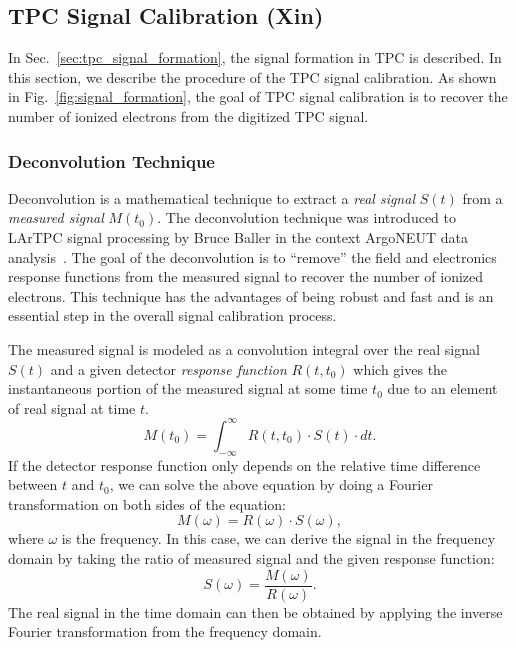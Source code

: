 \subsection{TPC Signal Calibration (Xin)}

In Sec.~\ref{sec:tpc_signal_formation}, the signal formation in TPC
is described. In this section, we describe the procedure of the TPC signal
calibration. As shown in Fig.~\ref{fig:signal_formation}, the goal of TPC 
signal calibration is to recover the number of ionized electrons from the 
digitized TPC signal. 

\subsubsection{Deconvolution Technique}\label{sec:decon}
Deconvolution is a mathematical technique to extract a \textit{real signal}
$S(t)$ from a \textit{measured signal} $M(t_0)$. 
The deconvolution technique was introduced to LArTPC signal processing by 
Bruce Baller in the context ArgoNEUT data analysis~\cite{bruce}. The goal of the 
deconvolution is to ``remove'' the field and electronics response functions 
from the measured signal to recover the number of ionized electrons. This 
technique has the advantages of being robust and fast and is an essential 
step in the overall signal calibration process. 

The measured signal is
modeled as a convolution integral over the real signal $S(t)$ and a
given detector \textit{response function} $R(t,t_0)$ which gives the
instantaneous portion of the measured signal at some time $t_0$ due to
an element of real signal at time $t$.
\begin{equation}\label{eq:decon_1}
M(t_0) = \int_{-\infty}^{\infty}  R(t,t_0) \cdot S(t) \cdot dt.
\end{equation}
If the detector response function only depends on the relative time 
difference between $t$ and $t_0$, we can solve the above equation by 
doing a Fourier transformation on both sides of the equation:
\begin{equation}
M(\omega) = R(\omega) \cdot S(\omega), 
\end{equation}
where $\omega$ is the frequency. In this case, we can derive the signal in the 
frequency domain by taking the ratio of measured signal and the given
response function:
\begin{equation}\label{eq:decon_2}
S(\omega) = \frac{M(\omega)}{R(\omega)}.
\end{equation}
The real signal in the time domain can then be obtained by applying the 
inverse Fourier transformation from the frequency domain. 


